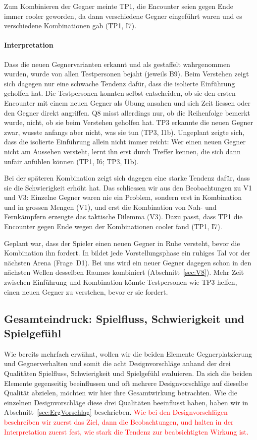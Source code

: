 \documentclass[../Main.tex]{subfiles}
\begin{document}
Zum Kombinieren der Gegner meinte TP1, die Encounter seien gegen Ende immer cooler geworden, da dann verschiedene Gegner eingeführt waren und es verschiedene Kombinationen gab (TP1, I7).

\paragraph{Interpretation}
Dass die neuen Gegnervarianten erkannt und als gestaffelt wahrgenommen wurden, wurde von allen Testpersonen bejaht (jeweils B9). Beim Verstehen zeigt sich dagegen nur eine schwache Tendenz dafür, dass die isolierte Einführung geholfen hat. Die Testpersonen konnten selbst entscheiden, ob sie den ersten Encounter mit einem neuen Gegner als Übung ansahen und sich Zeit liessen oder den Gegner direkt angriffen. Q8 misst allerdings nur, ob die Reihenfolge bemerkt wurde, nicht, ob sie beim Verstehen geholfen hat. TP3 erkannte die neuen Gegner zwar, wusste anfangs aber nicht, was sie tun (TP3, I1b). Ungeplant zeigte sich, dass die isolierte Einführung allein nicht immer reicht: Wer einen neuen Gegner nicht am Aussehen versteht, lernt ihn erst durch Treffer kennen, die sich dann unfair anfühlen können (TP1, I6; TP3, I1b).

Bei der späteren Kombination zeigt sich dagegen eine starke Tendenz dafür, dass sie die Schwierigkeit erhöht hat. Das schliessen wir aus den Beobachtungen zu V1 und V3: Einzelne Gegner waren nie ein Problem, sondern erst in Kombination und in grossen Mengen (V1), und erst die Kombination von Nah- und Fernkämpfern erzeugte das taktische Dilemma (V3). Dazu passt, dass TP1 die Encounter gegen Ende wegen der Kombinationen cooler fand (TP1, I7).

Geplant war, dass der Spieler einen neuen Gegner in Ruhe versteht, bevor die Kombination ihn fordert. In  bildet jede Vorstellungsphase ein ruhiges Tal vor der nächsten Arena (Frage~D1). Bei uns wird ein neuer Gegner dagegen schon in den nächsten Wellen desselben Raumes kombiniert (Abschnitt~\ref{sec:V8}). Mehr Zeit zwischen Einführung und Kombination könnte Testpersonen wie TP3 helfen, einen neuen Gegner zu verstehen, bevor er sie fordert.

\subsection{Gesamteindruck: Spielfluss, Schwierigkeit und Spielgefühl} \label{sec:Gesamteindruck} \label{sec:ErgAllgemein}

Wie bereits mehrfach erwähnt, wollen wir die beiden Elemente Gegnerplatzierung und Gegnerverhalten und somit die acht Designvorschläge anhand der drei Qualitäten Spielfluss, Schwierigkeit und Spielgefühl evaluieren. Da sich die beiden Elemente gegenseitig beeinflussen und oft mehrere Designvorschläge auf dieselbe Qualität abzielen, möchten wir hier ihre Gesamtwirkung betrachten. Wie die einzelnen Designvorschläge diese drei Qualitäten beeinflusst haben, haben wir in Abschnitt~\ref{sec:ErgVorschlag} beschrieben. \textcolor{red}{Wie bei den Designvorschlägen beschreiben wir zuerst das Ziel, dann die Beobachtungen, und halten in der Interpretation zuerst fest, wie stark die Tendenz zur beabsichtigten Wirkung ist.}
\end{document}
